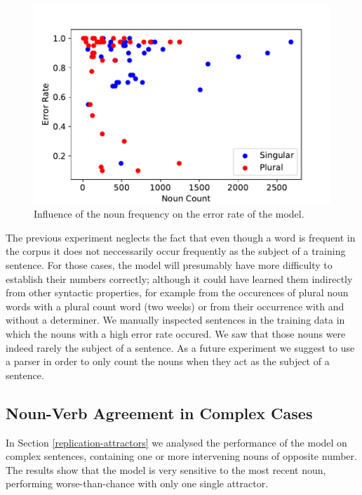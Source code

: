          \begin{figure}
          \centering
        \includegraphics[scale=0.5]{noun_freq_error_rate.pdf}
        \caption{Influence of the noun frequency on the error rate of the model.}
        \label{fig:noun_freq_error}
    \end{figure}
    
    
The previous experiment neglects the fact that even though a word is frequent in the corpus 
it does not neccessarily occur frequently as the subject of a training sentence. 
For those cases, the model will presumably 
have more difficulty to establish their numbers correctly;
although it could have learned them indirectly from other syntactic
properties, for example from the occurences of plural noun words
with a plural count word (two weeks) or from their occurrence 
with and without a determiner.
We manually inspected sentences in the training data in which
the nouns with a high error rate occured. We saw that those nouns were 
indeed rarely the subject of a sentence. As a future experiment we suggest 
to use a parser in order to only count the nouns when 
they act as the subject of a sentence. 

\subsection{Noun-Verb Agreement in Complex Cases}

In Section \ref{replication-attractors} we analysed the performance of the model
on complex sentences, containing one or more 
intervening nouns of opposite number.
The results show that the model is very
sensitive to the most recent noun,
performing worse-than-chance with only one single attractor.


